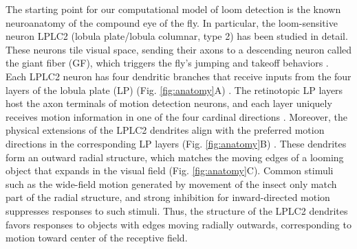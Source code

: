 \documentclass[pdftex,9pt,lineno]{elife}
\begin{document}
The starting point for our computational model of loom detection is the known neuroanatomy of the compound eye of the fly. In particular, the loom-sensitive neuron LPLC2 (lobula plate/lobula columnar, type 2) \citep{wu2016visual} has been studied in detail. These neurons tile visual space, sending their axons to a descending neuron called the giant fiber (GF), which triggers  the fly's jumping and takeoff behaviors \citep{card2008visually,von2017feature,ache2019neural}. Each LPLC2 neuron has four dendritic branches that receive inputs from the four layers of the lobula plate (LP) (Fig. \ref{fig:anatomy}A) \citep{maisak2013directional,klapoetke2017ultra}. The retinotopic LP layers host the axon terminals of motion detection neurons, and each layer uniquely receives motion information in one of the four cardinal directions \citep{maisak2013directional}. Moreover, the physical extensions of the LPLC2 dendrites align with the preferred motion directions in the corresponding LP layers (Fig. \ref{fig:anatomy}B) \citep{klapoetke2017ultra}. These dendrites form an outward radial structure, which matches the moving edges of a looming object that expands in the visual field (Fig. \ref{fig:anatomy}C). Common stimuli such as the wide-field motion generated by movement of the insect only match part of the radial structure, and strong inhibition for inward-directed motion suppresses responses to such stimuli. Thus, the structure of the LPLC2 dendrites favors responses to objects with edges moving radially outwards, corresponding to motion toward center of the receptive field.
\end{document}
